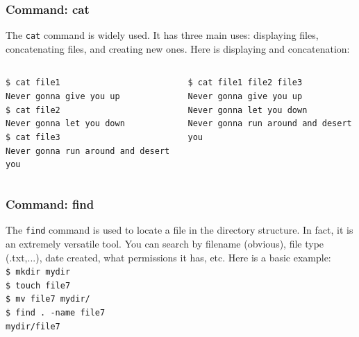 \documentclass{if-beamer}
\begin{document}
\begin{frame}
\frametitle{Command: cat}
The \texttt{cat} command is widely used. It has three main uses:
displaying files, concatenating files, and creating new ones. Here is
displaying and concatenation: \\[0.5cm]
\begin{columns}[t]
\begin{column}{0.4\textwidth}

\texttt{\$ cat file1} \\
\texttt{Never gonna give you up} \\
\texttt{\$ cat file2} \\
\texttt{Never gonna let you down} \\
\texttt{\$ cat file3} \\
\texttt{Never gonna run around and desert you} \\

\end{column}
\begin{column}{0.4\textwidth}

\texttt{\$ cat file1 file2 file3} \\
\texttt{Never gonna give you up} \\
\texttt{Never gonna let you down} \\
\texttt{Never gonna run around and desert you} \\

\end{column}
\end{columns}
\end{frame}

\begin{frame}
\frametitle{Command: find}
The \texttt{find} command is used to locate a file in the directory
structure. In fact, it is an extremely versatile tool. You can search by
filename (obvious), file type (.txt,...), date created, what permissions it has,
etc. Here is a basic example: \\[0.5cm]

\texttt{\$ mkdir mydir} \\
\texttt{\$ touch file7} \\
\texttt{\$ mv file7 mydir/} \\
\texttt{\$ find . -name file7} \\
\texttt{mydir/file7} \\

\end{frame}
\end{document}
